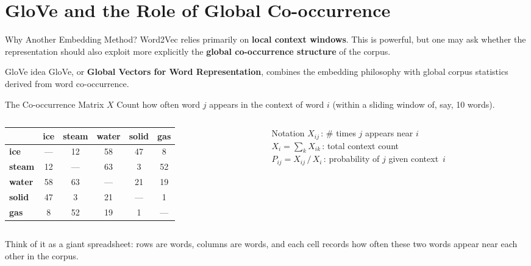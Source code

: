 \documentclass[11pt,aspectratio=169,professionalfonts]{beamer}
\begin{document}
\section{GloVe and the Role of Global Co-occurrence}
%
\begin{frame}{Why Another Embedding Method?}
Word2Vec relies primarily on \textbf{local context windows}. This is powerful, but one may ask whether the representation should also exploit more explicitly the \textbf{global co-occurrence structure} of the corpus.

\vspace{0.2cm}
\begin{block}{GloVe idea}
GloVe, or \textbf{Global Vectors for Word Representation}, combines the embedding philosophy with global corpus statistics derived from word co-occurrence.
\end{block}
\end{frame}
%
%
\begin{frame}{The Co-occurrence Matrix $X$}
  Count how often word $j$ appears in the context of word $i$
  (within a sliding window of, say, 10 words).

  \vspace{.5cm}
  \begin{columns}[T]
    \begin{column}{0.55\textwidth}
      \centering
      \small
      \begin{tabular}{l|ccccc}
        \toprule
        & \textbf{ice} & \textbf{steam} & \textbf{water} & \textbf{solid} & \textbf{gas} \\
        \midrule
        \textbf{ice}   & ---  & 12 & 58 & 47 & 8  \\
        \textbf{steam} & 12   & --- & 63 & 3  & 52 \\
        \textbf{water} & 58   & 63 & --- & 21 & 19 \\
        \textbf{solid} & 47   & 3  & 21 & --- & 1  \\
        \textbf{gas}   & 8    & 52 & 19 & 1  & --- \\
        \bottomrule
      \end{tabular}
    \end{column}
    \begin{column}{0.40\textwidth}
	\vspace{-.3cm}
      \begin{block}{Notation}
        $X_{ij}$\,: \# times $j$ appears near $i$\\[6pt]
        $X_i = \sum_{k} X_{ik}$\,: total context count\\[6pt]
        $P_{ij} = X_{ij}\,/\,X_i$\,: probability of $j$ given context~$i$
      \end{block}
    \end{column}
  \end{columns}

  \vspace{6pt}
  Think of it as a giant spreadsheet: rows are words, columns are words, and each cell records how often these two words appear near each other in the corpus.
\end{frame}
\end{document}
